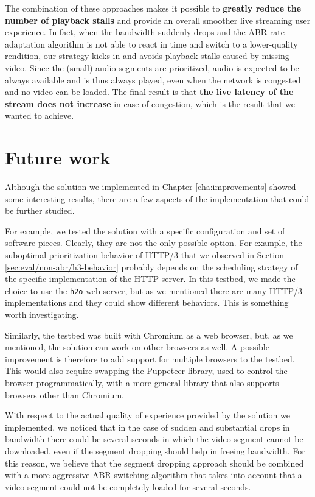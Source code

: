 The combination of these approaches makes it possible to \textbf{greatly reduce the number of playback stalls} and provide an overall smoother live streaming user experience. In fact, when the bandwidth suddenly drops and the ABR rate adaptation algorithm is not able to react in time and switch to a lower-quality rendition, our strategy kicks in and avoids playback stalls caused by missing video. Since the (small) audio segments are prioritized, audio is expected to be always available and is thus always played, even when the network is congested and no video can be loaded. The final result is that \textbf{the live latency of the stream does not increase} in case of congestion, which is the result that we wanted to achieve.

\section{Future work}
\label{sec:conclusions/future}

Although the solution we implemented in Chapter \ref{cha:improvements} showed some interesting results, there are a few aspects of the implementation that could be further studied.

For example, we tested the solution with a specific configuration and set of software pieces. Clearly, they are not the only possible option. For example, the suboptimal prioritization behavior of HTTP/3 that we observed in Section \ref{sec:eval/non-abr/h3-behavior} probably depends on the scheduling strategy of the specific implementation of the HTTP server. In this testbed, we made the choice to use the \texttt{h2o} web server, but as we mentioned there are many HTTP/3 implementations and they could show different behaviors. This is something worth investigating.

Similarly, the testbed was built with Chromium as a web browser, but, as we mentioned, the solution can work on other browsers as well. A possible improvement is therefore to add support for multiple browsers to the testbed. This would also require swapping the Puppeteer library, used to control the browser programmatically, with a more general library that also supports browsers other than Chromium.

With respect to the actual quality of experience provided by the solution we implemented, we noticed that in the case of sudden and substantial drops in bandwidth there could be several seconds in which the video segment cannot be downloaded, even if the segment dropping should help in freeing bandwidth. For this reason, we believe that the segment dropping approach should be combined with a more aggressive ABR switching algorithm that takes into account that a video segment could not be completely loaded for several seconds.


